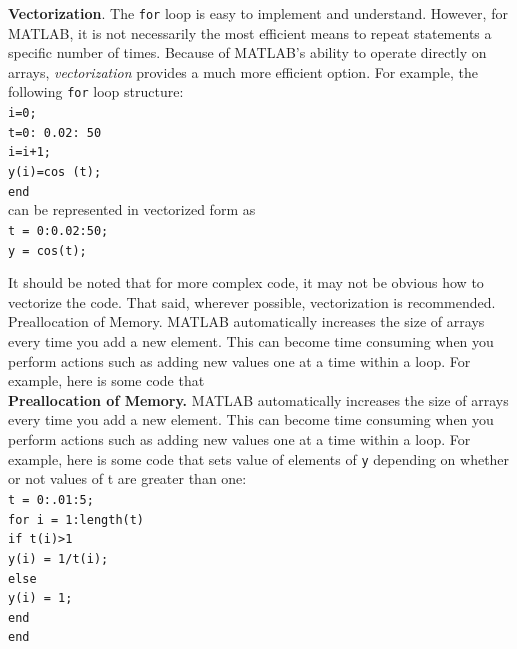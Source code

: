 \documentclass[../main.tex]{subfiles}
\begin{document}
\noindent \textbf{Vectorization}. The \texttt{for} loop is easy to implement and understand. However, for MATLAB, it is not necessarily the most efficient means to repeat statements a specific number of times. Because of MATLAB's ability to operate directly on arrays, \emph{vectorization} provides a much more efficient option. For example, the following \texttt{for} loop structure:\\

\texttt{i=0;\\
\indent t=0: 0.02: 50\\
\indent\hspace{2mm} i=i+1;\\
\indent\hspace{2mm} y(i)=cos (t);\\
\indent end}\\

\noindent can be represented in vectorized form as\\

\texttt{t = 0:0.02:50;\\
\indent y = cos(t);\\}

\noindent It should be noted that for more complex code, it may not be obvious how to vectorize the code. That said, wherever possible, vectorization is recommended.
Preallocation of Memory. MATLAB automatically increases the size of arrays every time you add a new element. This can become time consuming when you perform actions such as adding new values one at a time within a loop. For example, here is some code that\\

\noindent\textbf{Preallocation of Memory.} MATLAB automatically increases the size of arrays every
time you add a new element. This can become time consuming when you perform actions
such as adding new values one at a time within a loop. For example, here is some code that
sets value of elements of \texttt{y} depending on whether or not values of t are greater than one:\\

\texttt{t = 0:.01:5;\\
\indent for i = 1:length(t)\\
\indent\hspace{2mm} if t(i)>1\\
\indent\hspace{4mm} y(i) = 1/t(i);\\
\indent\hspace{2mm} else\\
\indent\hspace{4mm} y(i) = 1;\\
\indent\hspace{2mm} end\\
\indent end\\}
\end{document}
